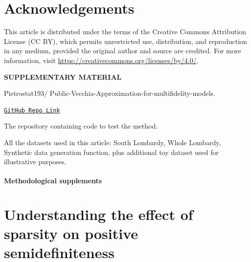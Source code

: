 \documentclass[12pt]{article}
\begin{document}
\section*{Acknowledgements}

This article is distributed under the terms of the Creative Commons Attribution License (CC BY), which permits unrestricted use, distribution, and reproduction in any medium, provided the original author and source are credited. For more information, visit 
 \url{https://creativecommons.org/licenses/by/4.0/}.


\bigskip
\begin{center}
{\large\bf SUPPLEMENTARY MATERIAL}
\end{center}




\begin{description}
\item[Title:] Pietrostat193/
Public-Vecchia-Approximation-for-multifidelity-models.
\item \href{https://github.com/Pietrostat193/Public-Vecchia-Approximation-for-multifidelity-models}{\texttt{GitHub Repo Link}}
\item[Matlab-code:] The repository containing code to test the method.
\item[Datasets:] All the datasets used in this article: South Lombardy, Whole Lombardy, Synthetic data generation function, plus additional toy dataset used for illustrative purposes.
\end{description}








\newpage %
\appendix %




\paragraph{Methodological supplements}
\section{Understanding the effect of sparsity on positive semidefiniteness} \label{PositiveSemiDefinite}
\end{document}
